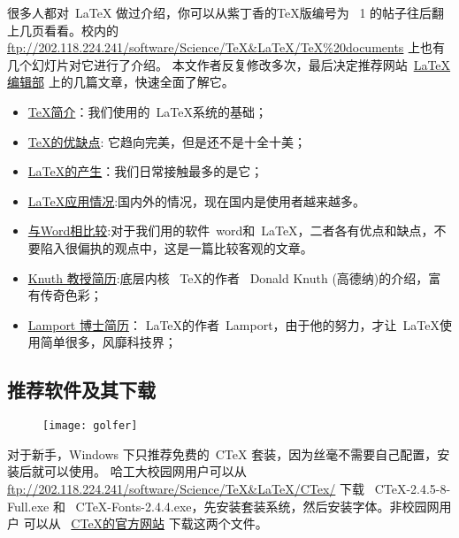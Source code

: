     很多人都对~\LaTeX{} 做过介绍，你可以从紫丁香的TeX版编号为~ 1 的帖子往后翻上几页看看。校内的
    \url{ftp://202.118.224.241/software/Science/TeX&LaTeX/TeX\%20documents} 上也有几个幻灯片对它进行了介绍。
    本文作者反复修改多次，最后决定推荐网站~\href{http://zzg34b.w3.c361.com/index.htm}{LaTeX编辑部} 上的几篇文章，快速全面了解它。
   \begin{itemize}
     \item  \href{http://learn.tsinghua.edu.cn:8080/2001315450/tex_frame.html}{TeX简介}：我们使用的~\LaTeX 系统的基础；
     \item \href{http://zzg34b.w3.c361.com/homepage/TeXvirtue.htm}{TeX的优缺点}: 它趋向完美，但是还不是十全十美；
     \item \href{http://zzg34b.w3.c361.com/homepage/LaTeXbring.htm}{LaTeX的产生}：我们日常接触最多的是它；
     \item \href{http://zzg34b.w3.c361.com/homepage/compareWord.htm}{LaTeX应用情况}:国内外的情况，现在国内是使用者越来越多。
     \item \href{http://zzg34b.w3.c361.com/homepage/compareWord.htm}{与Word相比较}:对于我们用的软件~word和~LaTeX，二者各有优点和缺点，不要陷入很偏执的观点中，这是一篇比较客观的文章。
     \item \href{http://zzg34b.w3.c361.com/homepage/KnuthResume.htm}{Knuth 教授简历}:底层内核~ \TeX 的作者~ Donald Knuth (高德纳)的介绍，富有传奇色彩；
     \item \href{http://zzg34b.w3.c361.com/homepage/LamportResume.htm}{Lamport 博士简历}： \LaTeX 的作者~Lamport，由于他的努力，才让~\LaTeX 使用简单很多，风靡科技界；
   \end{itemize}

\subsection{推荐软件及其下载}
\label{sec:latexsoftware}
\begin{figure}[htbp]
\centering
\texttt{[image: golfer]}
\label{Figure:Tricks:Example12}
\end{figure}
对于新手，Windows 下只推荐免费的~CTeX 套装，因为丝毫不需要自己配置，安装后就可以使用。
哈工大校园网用户可以从~ \url{ftp://202.118.224.241/software/Science/TeX&LaTeX/CTex/} 下载~
CTeX-2.4.5-8-Full.exe 和~ CTeX-Fonts-2.4.4.exe，先安装套装系统，然后安装字体。非校园网用户
可以从~ \href{http://www.ctex.org}{CTeX的官方网站} 下载这两个文件。

